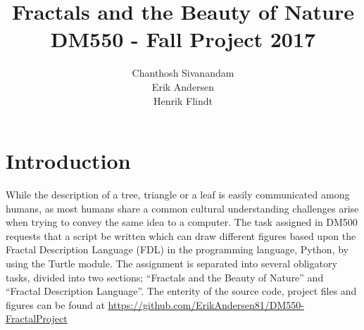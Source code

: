 \documentclass[titlepage]{article}
\author{Chanthosh Sivanandam \\ Erik Andersen \\ Henrik Flindt }
\title{Fractals and the Beauty of Nature \\ DM550 - Fall Project 2017}
\begin{document}
\maketitle
\tableofcontents
\newpage
\section{Introduction}
While the description of a tree, triangle or a leaf is easily communicated among humans, as most humans share a common cultural understanding challenges arise when trying to convey the same idea to a computer. The task assigned in DM500 requests that a script be written which can draw different figures based upon the Fractal Description Language (FDL) in the programming language, Python, by using the Turtle module. The assignment is separated into several obligatory tasks, divided into two sections; “Fractals and the Beauty of Nature” and “Fractal Description Language''. The enterity of the source code, project files and figures can be found at \href{https://github.com/ErikAndersen81/DM550-FractalProject}{https://github.com/ErikAndersen81/DM550-FractalProject}
\end{document}
